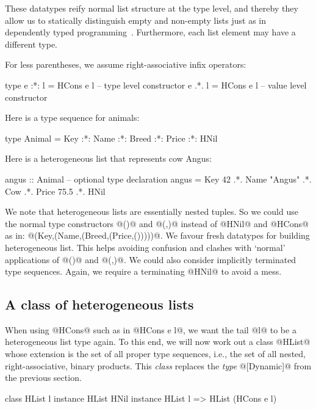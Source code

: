 \documentclass[nocopyrightspace,preprint]{sigplan-proc}
\begin{document}
These datatypes reify normal list structure at the type level, and
thereby they allow us to statically distinguish empty and non-empty
lists just as in dependently typed programming~\cite{Hallgren01,Fake}.
Furthermore, each list element may have a different type.

For less parentheses, we assume right-associative infix operators:

\begin{code}
 type e :*: l = HCons e l  -- type level constructor
 e .*. l      = HCons e l  -- value level constructor
\end{code}

Here is a type sequence for animals:

\begin{code}
 type Animal =
   Key :*: Name :*: Breed :*: Price :*: HNil
\end{code}

Here is a heterogeneous list that represents cow Angus:

\begin{code}
 angus :: Animal -- optional type declaration
 angus =  Key 42
      .*. Name "Angus"
      .*. Cow
      .*. Price 75.5
      .*. HNil
\end{code}

We note that heterogeneous lists are essentially nested tuples. So we
could use the normal type constructors @()@ and @(,)@ instead of
@HNil@ and @HCons@ as in: @(Key,(Name,(Breed,(Price,()))))@. We favour
fresh datatypes for building heterogeneous list. This helps avoiding
confusion and clashes with `normal' applications of @()@ and
@(,)@. We could also consider implicitly terminated type
sequences. Again, we require a terminating @HNil@ to avoid a mess.

\medskip

\subsection*{A class of heterogeneous lists}

When using @HCons@ such as in @HCons e l@, we want the tail @l@ to be
a heterogeneous list type again. To this end, we will now work out a
class @HList@ whose extension is the set of all proper type sequences,
i.e., the set of all nested, right-associative, binary products. This
\emph{class} replaces the \emph{type} @[Dynamic]@ from the previous
section.

\begin{code}
 class HList l
 instance HList HNil
 instance HList l => HList (HCons e l)
\end{code}
\end{document}
